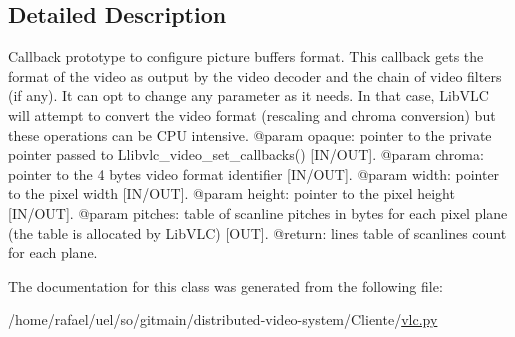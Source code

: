 \subsection{Detailed Description}
\begin{DoxyVerb}Callback prototype to configure picture buffers format.
This callback gets the format of the video as output by the video decoder
and the chain of video filters (if any). It can opt to change any parameter
as it needs. In that case, LibVLC will attempt to convert the video format
(rescaling and chroma conversion) but these operations can be CPU intensive.
@param opaque: pointer to the private pointer passed to L{libvlc_video_set_callbacks}() [IN/OUT].
@param chroma: pointer to the 4 bytes video format identifier [IN/OUT].
@param width: pointer to the pixel width [IN/OUT].
@param height: pointer to the pixel height [IN/OUT].
@param pitches: table of scanline pitches in bytes for each pixel plane (the table is allocated by LibVLC) [OUT].
@return: lines table of scanlines count for each plane.
\end{DoxyVerb}
 

The documentation for this class was generated from the following file\+:\begin{DoxyCompactItemize}
\item 
/home/rafael/uel/so/gitmain/distributed-\/video-\/system/\+Cliente/\hyperlink{vlc_8py}{vlc.\+py}\end{DoxyCompactItemize}
